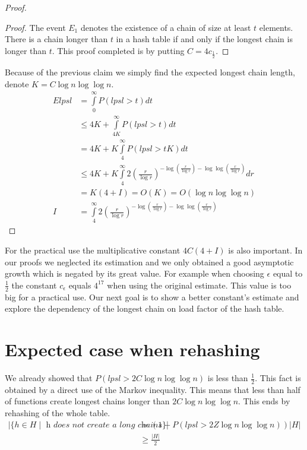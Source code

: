 \begin{proof}
\begin{proof}
The event $E_1$ denotes the existence of a chain of size at least $t$ elements. There is a chain longer than $t$ in a hash table if and only if the longest chain is longer than $t$. This proof completed is by putting $C = 4c_{\frac{1}{2}}$.
\end{proof}

Because of the previous claim we simply find the expected longest chain length, denote $K = C\log n \log \log n$.
\begin{displaymath}
\begin{split}
E lpsl 
	& = \int\limits_0^{\infty} P(lpsl > t) dt \\
	& \leq 4K + \int\limits_{4K}^\infty P(lpsl > t) dt \\
	& = 4K + K \int\limits_4^\infty P(lpsl > tK) dt \\
	& \leq 4K + K \int\limits_4^\infty 2 \left(\frac{r}{\log r}\right)^{-\log \left(\frac{r}{\log r}\right) - \log \log \left(\frac{r}{\log r}\right)} dr \\
	& = K(4 + I) = O(K) = O(\log n \log \log n) \\
I 	& = \int\limits_4^\infty 2 \left(\frac{r}{\log r}\right)^{-\log \left(\frac{r}{\log r}\right) - \log \log \left(\frac{r}{\log r}\right)}
\end{split}
\end{displaymath}
\end{proof}

For the practical use the multiplicative constant $4C(4 + I)$ is also important. In our proofs we neglected its estimation and we only obtained a good asymptotic growth which is negated by its great value. For example when choosing $\epsilon$ equal to $\frac{1}{2}$ the constant $c_\epsilon$ equals $4 ^ {17}$ when using the original estimate. This value is too big for a practical use. Our next goal is to show a better constant's estimate and explore the dependency of the longest chain on load factor of the hash table.

\section{Expected case when rehashing}
We already showed that $P(lpsl > 2C \log n \log \log n)$ is less than $\frac{1}{2}$. This fact is obtained by a direct use of the Markov inequality. This means that less than half of functions create longest chains longer than $2C \log n \log \log n$. This ends by rehashing of the whole table.
\begin{displaymath}
\begin{split}
|\lbrace h \in H \mid \textit{ h does not create a long chains} \rbrace| 
	& = \left(1 - P(lpsl > 2Z \log n \log \log n)\right) |H|  \\
	& \geq \frac{|H|}{2} \\
\end{split}
\end{displaymath}

